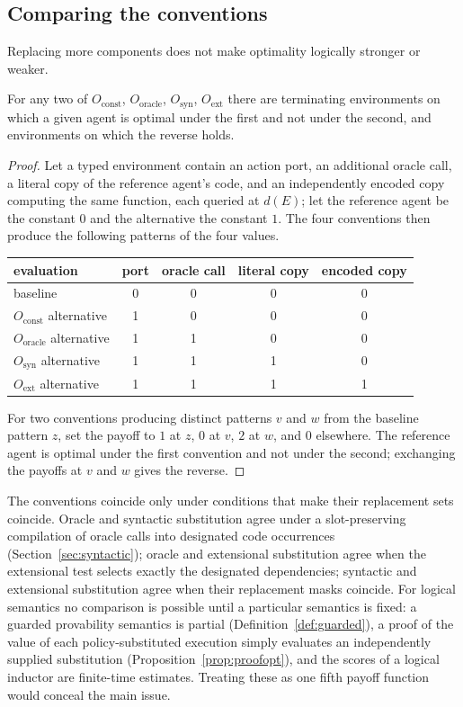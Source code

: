\subsection{Comparing the conventions}

Replacing more components does not make optimality logically stronger or weaker.

\begin{proposition}\label{prop:nonimplication}
For any two of $O_{\mathrm{const}}$, $O_{\mathrm{oracle}}$, $O_{\mathrm{syn}}$, $O_{\mathrm{ext}}$ there
are terminating environments on which a given agent is optimal under the first and not under the
second, and environments on which the reverse holds.
\end{proposition}

\begin{proof}
Let a typed environment contain an action port, an additional oracle call, a literal copy of the
reference agent's code, and an independently encoded copy computing the same function, each
queried at $d(E)$; let the reference agent be the constant $0$ and the alternative the constant $1$.
The four conventions then produce the following patterns of the four values.
\begin{center}
\small
\begin{tabular}{@{}lcccc@{}}
  \toprule
  evaluation & port & oracle call & literal copy & encoded copy \\
  \midrule
  baseline                & 0 & 0 & 0 & 0 \\
  $O_{\mathrm{const}}$ alternative  & 1 & 0 & 0 & 0 \\
  $O_{\mathrm{oracle}}$ alternative & 1 & 1 & 0 & 0 \\
  $O_{\mathrm{syn}}$ alternative    & 1 & 1 & 1 & 0 \\
  $O_{\mathrm{ext}}$ alternative    & 1 & 1 & 1 & 1 \\
  \bottomrule
\end{tabular}
\end{center}
For two conventions producing distinct patterns $v$ and $w$ from the baseline pattern $z$, set the
payoff to $1$ at $z$, $0$ at $v$, $2$ at $w$, and $0$ elsewhere. The reference agent is optimal under
the first convention and not under the second; exchanging the payoffs at $v$ and $w$ gives the
reverse.
\end{proof}

The conventions coincide only under conditions that make their replacement sets coincide.
Oracle and syntactic substitution agree under a slot-preserving compilation of oracle calls into
designated code occurrences (Section~\ref{sec:syntactic}); oracle and extensional substitution agree
when the extensional test selects exactly the designated dependencies; syntactic and extensional
substitution agree when their replacement masks coincide. For logical semantics no comparison is
possible until a particular semantics is fixed: a guarded provability semantics is partial
(Definition~\ref{def:guarded}), a proof of the value of each policy-substituted execution simply
evaluates an independently supplied substitution (Proposition~\ref{prop:proofopt}), and the scores
of a logical inductor are finite-time estimates. Treating these as one fifth payoff function would
conceal the main issue.
